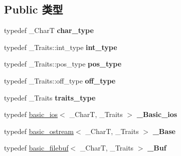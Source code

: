 \subsection*{Public 类型}
\begin{DoxyCompactItemize}
\item 
\mbox{\label{classbasic__ofstream_aa6bd5f4715cdaca68aedaee2a743ae76}} 
typedef \+\_\+\+CharT {\bfseries char\+\_\+type}
\item 
\mbox{\label{classbasic__ofstream_a668e624430ede162a94674ccbac4a4fe}} 
typedef \+\_\+\+Traits\+::int\+\_\+type {\bfseries int\+\_\+type}
\item 
\mbox{\label{classbasic__ofstream_a87383f271b5abfd9009a9c59f279ceff}} 
typedef \+\_\+\+Traits\+::pos\+\_\+type {\bfseries pos\+\_\+type}
\item 
\mbox{\label{classbasic__ofstream_a023926629930a5ca120eb7529ebd6e74}} 
typedef \+\_\+\+Traits\+::off\+\_\+type {\bfseries off\+\_\+type}
\item 
\mbox{\label{classbasic__ofstream_a0e5e164485e43e59977fc8c6b350dde7}} 
typedef \+\_\+\+Traits {\bfseries traits\+\_\+type}
\item 
\mbox{\label{classbasic__ofstream_acfb3718e0f86d8b6e48d0f99bba7f2af}} 
typedef \hyperlink{classbasic__ios}{basic\+\_\+ios}$<$ \+\_\+\+CharT, \+\_\+\+Traits $>$ {\bfseries \+\_\+\+Basic\+\_\+ios}
\item 
\mbox{\label{classbasic__ofstream_a203e2ae5b4d0a917a7dfe528aa65fae7}} 
typedef \hyperlink{classbasic__ostream}{basic\+\_\+ostream}$<$ \+\_\+\+CharT, \+\_\+\+Traits $>$ {\bfseries \+\_\+\+Base}
\item 
\mbox{\label{classbasic__ofstream_af31ecc3e18597074b6e9a01507956c4f}} 
typedef \hyperlink{classbasic__filebuf}{basic\+\_\+filebuf}$<$ \+\_\+\+CharT, \+\_\+\+Traits $>$ {\bfseries \+\_\+\+Buf}
\end{DoxyCompactItemize}
